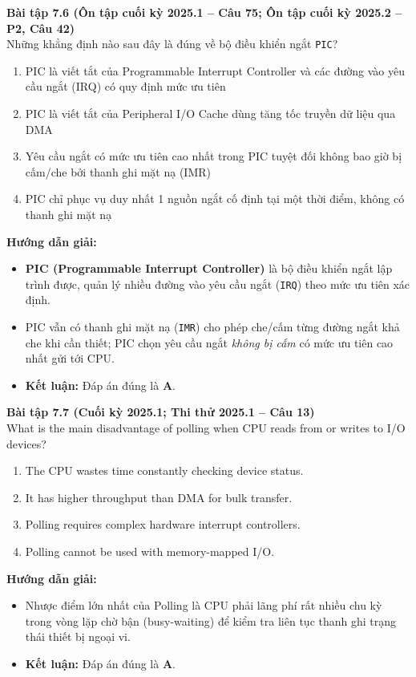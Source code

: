 \textbf{Bài tập 7.6 (Ôn tập cuối kỳ 2025.1 -- Câu 75; Ôn tập cuối kỳ 2025.2 -- P2, Câu 42)}\\
Những khẳng định nào sau đây là đúng về bộ điều khiển ngắt \texttt{PIC}?
\begin{enumerate}[label=\Alph*.]
    \item PIC là viết tắt của Programmable Interrupt Controller và các đường vào yêu cầu ngắt (IRQ) có quy định mức ưu tiên
    \item PIC là viết tắt của Peripheral I/O Cache dùng tăng tốc truyền dữ liệu qua DMA
    \item Yêu cầu ngắt có mức ưu tiên cao nhất trong PIC tuyệt đối không bao giờ bị cấm/che bởi thanh ghi mặt nạ (IMR)
    \item PIC chỉ phục vụ duy nhất 1 nguồn ngắt cố định tại một thời điểm, không có thanh ghi mặt nạ
\end{enumerate}
\textbf{Hướng dẫn giải:}
\begin{itemize}
    \item \textbf{PIC (Programmable Interrupt Controller)} là bộ điều khiển ngắt lập trình được, quản lý nhiều đường vào yêu cầu ngắt (\texttt{IRQ}) theo mức ưu tiên xác định.
    \item PIC vẫn có thanh ghi mặt nạ (\texttt{IMR}) cho phép che/cấm từng đường ngắt khả che khi cần thiết; PIC chọn yêu cầu ngắt \textit{không bị cấm} có mức ưu tiên cao nhất gửi tới CPU.
    \item \textbf{Kết luận:} Đáp án đúng là \textbf{A}.
\end{itemize}

\textbf{Bài tập 7.7 (Cuối kỳ 2025.1; Thi thử 2025.1 -- Câu 13)}\\
What is the main disadvantage of polling when CPU reads from or writes to I/O devices?
\begin{enumerate}[label=\Alph*.]
    \item The CPU wastes time constantly checking device status.
    \item It has higher throughput than DMA for bulk transfer.
    \item Polling requires complex hardware interrupt controllers.
    \item Polling cannot be used with memory-mapped I/O.
\end{enumerate}
\textbf{Hướng dẫn giải:}
\begin{itemize}
    \item Nhược điểm lớn nhất của Polling là CPU phải lãng phí rất nhiều chu kỳ trong vòng lặp chờ bận (busy-waiting) để kiểm tra liên tục thanh ghi trạng thái thiết bị ngoại vi.
    \item \textbf{Kết luận:} Đáp án đúng là \textbf{A}.
\end{itemize}

